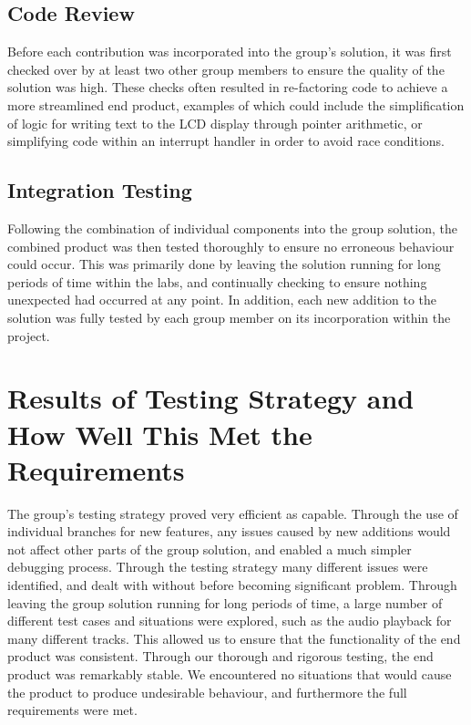 \subsection*{Code Review}

Before each contribution was incorporated into the group's solution, it was 
first checked over by at least two other group members to ensure the quality of 
the solution was high. These checks often resulted in re-factoring code to 
achieve a more streamlined end product, examples of which could include the 
simplification of logic for writing text to the LCD display through pointer 
arithmetic, or simplifying code within an interrupt handler in order to avoid 
race conditions. 

\subsection*{Integration Testing}

Following the combination of individual components into the group solution, the 
combined product was then tested thoroughly to ensure no erroneous behaviour 
could occur. This was primarily done by leaving the solution running for long 
periods of time within the labs, and continually checking to ensure nothing unexpected 
had occurred at any point.
In addition, each new addition to the solution was fully tested by each group 
member on its incorporation within the project. 

\section{Results of Testing Strategy and How Well This Met the Requirements}

The group's testing strategy proved very efficient as capable. Through the use 
of individual branches for new features, any issues caused by new additions would 
not affect other parts of the group solution, and enabled a much simpler debugging 
process.  
Through the testing strategy many different issues were identified, and dealt 
with without before becoming significant problem. 
Through leaving the group solution running for long periods of time, a large 
number of different test cases and situations were explored, such as the audio 
playback for many different tracks. This allowed us to ensure that the 
functionality of the end product was consistent.
Through our thorough and rigorous testing, the end product was remarkably stable. 
We encountered no situations that would cause the product to produce undesirable 
behaviour, and furthermore the full requirements were met.

